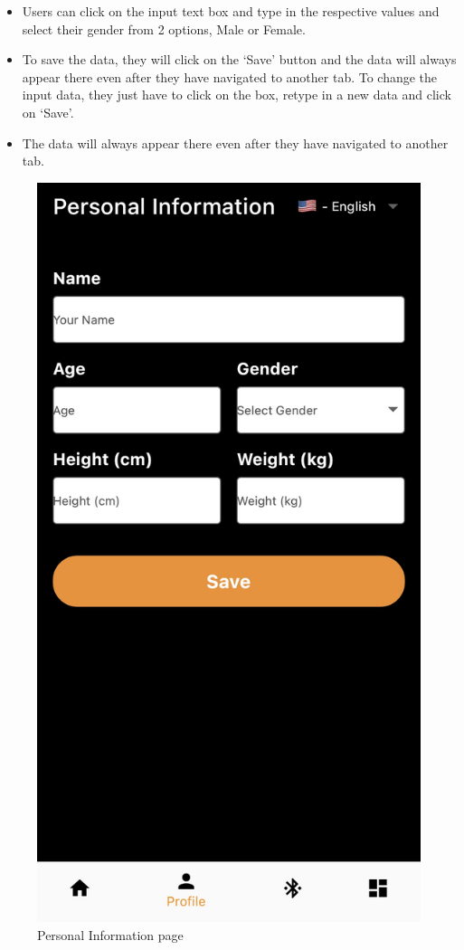 \documentclass[a4paper]{scrreprt}
\begin{document}
\begin{itemize}
    \item Users can click on the input text box and type in the respective values and select their gender from 2 options, Male or Female.
    \item To save the data, they will click on the ‘Save’ button and the data will always appear there even after they have navigated to another tab. To change the input data, they just have to click on the box, retype in a new data and click on ‘Save’.
    \item The data will always appear there even after they have navigated to another tab.
\end{itemize}

\begin{figure}[h]
    \centering
    \includegraphics[scale=0.125]{personal_info.png}
    \caption{Personal Information page}
    \label{fig:personal-info}
\end{figure}
\clearpage
\end{document}
